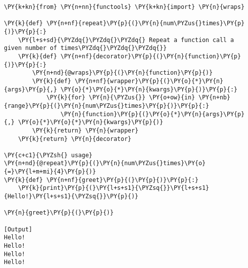 \begin{Verbatim}[label=\makebox{\url{https://github.com/lucabaldini/cmepda/tree/master/slides/latex/snippets/decorator\_repeat.py}},commandchars=\\\{\}]
\PY{k+kn}{from} \PY{n+nn}{functools} \PY{k+kn}{import} \PY{n}{wraps}

\PY{k}{def} \PY{n+nf}{repeat}\PY{p}{(}\PY{n}{num\PYZus{}times}\PY{p}{)}\PY{p}{:}
    \PY{l+s+sd}{\PYZdq{}\PYZdq{}\PYZdq{} Repeat a function call a given number of times\PYZdq{}\PYZdq{}\PYZdq{}}
    \PY{k}{def} \PY{n+nf}{decorator}\PY{p}{(}\PY{n}{function}\PY{p}{)}\PY{p}{:}
        \PY{n+nd}{@wraps}\PY{p}{(}\PY{n}{function}\PY{p}{)}
        \PY{k}{def} \PY{n+nf}{wrapper}\PY{p}{(}\PY{o}{*}\PY{n}{args}\PY{p}{,} \PY{o}{*}\PY{o}{*}\PY{n}{kwargs}\PY{p}{)}\PY{p}{:}
            \PY{k}{for} \PY{n}{\PYZus{}} \PY{o+ow}{in} \PY{n+nb}{range}\PY{p}{(}\PY{n}{num\PYZus{}times}\PY{p}{)}\PY{p}{:}
                \PY{n}{function}\PY{p}{(}\PY{o}{*}\PY{n}{args}\PY{p}{,} \PY{o}{*}\PY{o}{*}\PY{n}{kwargs}\PY{p}{)}
        \PY{k}{return} \PY{n}{wrapper}
    \PY{k}{return} \PY{n}{decorator}

\PY{c+c1}{\PYZsh{} usage}
\PY{n+nd}{@repeat}\PY{p}{(}\PY{n}{num\PYZus{}times}\PY{o}{=}\PY{l+m+mi}{4}\PY{p}{)}
\PY{k}{def} \PY{n+nf}{greet}\PY{p}{(}\PY{p}{)}\PY{p}{:}
    \PY{k}{print}\PY{p}{(}\PY{l+s+s1}{\PYZsq{}}\PY{l+s+s1}{Hello!}\PY{l+s+s1}{\PYZsq{}}\PY{p}{)}

\PY{n}{greet}\PY{p}{(}\PY{p}{)}

[Output]
Hello!
Hello!
Hello!
Hello!
\end{Verbatim}